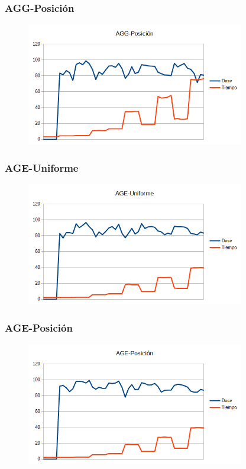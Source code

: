 \documentclass{article}
\begin{document}
    \subsubsection{AGG-Posición}

    \begin{figure}[h]
        \centering
        \includegraphics[width=0.85\textwidth]{graficoAGGP.png}
    \end{figure}

    \pagebreak
    \subsubsection{AGE-Uniforme}

    \begin{figure}[h]
        \centering
        \includegraphics[width=0.85\textwidth]{graficoAGEU.png}
    \end{figure}

    \subsubsection{AGE-Posición}

    \begin{figure}[h]
        \centering
        \includegraphics[width=0.85\textwidth]{graficoAGEP.png}
    \end{figure}
\end{document}

